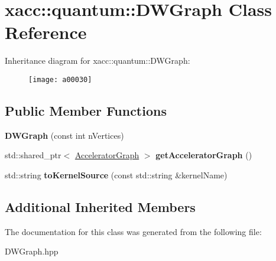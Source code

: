 \hypertarget{a00030}{}\section{xacc\+:\+:quantum\+:\+:D\+W\+Graph Class Reference}
\label{a00030}
Inheritance diagram for xacc\+:\+:quantum\+:\+:D\+W\+Graph\+:\begin{figure}[H]
\begin{center}
\leavevmode
\texttt{[image: a00030]}
\end{center}
\end{figure}
\subsection*{Public Member Functions}
\begin{DoxyCompactItemize}
\item 
{\bfseries D\+W\+Graph} (const int n\+Vertices)\hypertarget{a00030_adc891c7ec39fbb480d9102c3b0458e4c}{}\label{a00030_adc891c7ec39fbb480d9102c3b0458e4c}

\item 
std\+::shared\+\_\+ptr$<$ \hyperlink{a00043}{Accelerator\+Graph} $>$ {\bfseries get\+Accelerator\+Graph} ()\hypertarget{a00030_acdce3a79dfc4e296c215ac95f6fef8f5}{}\label{a00030_acdce3a79dfc4e296c215ac95f6fef8f5}

\item 
std\+::string {\bfseries to\+Kernel\+Source} (const std\+::string \&kernel\+Name)\hypertarget{a00030_a636bf17193ae20ae6355755dacafdf98}{}\label{a00030_a636bf17193ae20ae6355755dacafdf98}

\end{DoxyCompactItemize}
\subsection*{Additional Inherited Members}


The documentation for this class was generated from the following file\+:\begin{DoxyCompactItemize}
\item 
D\+W\+Graph.\+hpp\end{DoxyCompactItemize}
